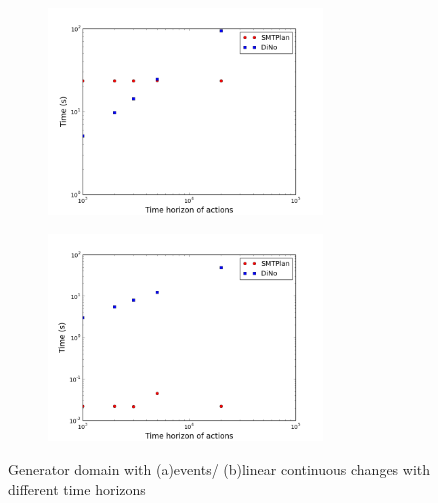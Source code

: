\begin{figure}[tbp!]
\centering
\begin{subfigure}[b]{0.49\textwidth}
\includegraphics[width=0.80\textwidth]{diagrams/Generator_event.png}
\caption{}
\label{fig:Picture4}
\end{subfigure}
\hfill
\begin{subfigure}[b]{0.48\textwidth}
\includegraphics[width=0.80\textwidth]{diagrams/Generator_linear.png}
\caption{}
\label{fig:Picture3}
\end{subfigure}
\caption{Generator domain with (a)events/ (b)linear continuous changes with different time horizons}
\end{figure}


